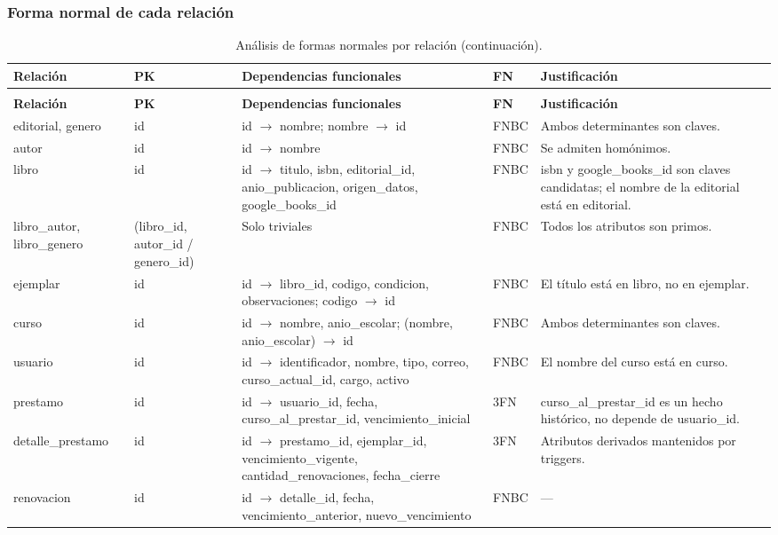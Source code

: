 \documentclass[11pt,a4paper]{article}
\begin{document}
\subsubsection{Forma normal de cada relación}
{\small
\begin{longtable}{@{}p{} p{} p{} l p{}@{}}
\caption{Análisis de formas normales por relación.}\\
\toprule
\textbf{Relación} & \textbf{PK} & \textbf{Dependencias funcionales} & \textbf{FN} & \textbf{Justificación}\\
\midrule
\endfirsthead
\caption[]{Análisis de formas normales por relación (continuación).}\\
\toprule
\textbf{Relación} & \textbf{PK} & \textbf{Dependencias funcionales} & \textbf{FN} & \textbf{Justificación}\\
\midrule
\endhead
editorial, genero & id & id $\to$ nombre; nombre $\to$ id & FNBC & Ambos determinantes son claves.\\
autor & id & id $\to$ nombre & FNBC & Se admiten homónimos.\\
libro & id & id $\to$ titulo, isbn, editorial\_id, anio\_publicacion, origen\_datos, google\_books\_id & FNBC & isbn y google\_books\_id son claves candidatas; el nombre de la editorial está en editorial.\\
libro\_autor, libro\_genero & (libro\_id, autor\_id / genero\_id) & Solo triviales & FNBC & Todos los atributos son primos.\\
ejemplar & id & id $\to$ libro\_id, codigo, condicion, observaciones; codigo $\to$ id & FNBC & El título está en libro, no en ejemplar.\\
curso & id & id $\to$ nombre, anio\_escolar; (nombre, anio\_escolar) $\to$ id & FNBC & Ambos determinantes son claves.\\
usuario & id & id $\to$ identificador, nombre, tipo, correo, curso\_actual\_id, cargo, activo & FNBC & El nombre del curso está en curso.\\
prestamo & id & id $\to$ usuario\_id, fecha, curso\_al\_prestar\_id, vencimiento\_inicial & 3FN & curso\_al\_prestar\_id es un hecho histórico, no depende de usuario\_id.\\
detalle\_prestamo & id & id $\to$ prestamo\_id, ejemplar\_id, vencimiento\_vigente, cantidad\_renovaciones, fecha\_cierre & 3FN & Atributos derivados mantenidos por triggers.\\
renovacion & id & id $\to$ detalle\_id, fecha, vencimiento\_anterior, nuevo\_vencimiento & FNBC & ---\\

\end{longtable}}
\end{document}
